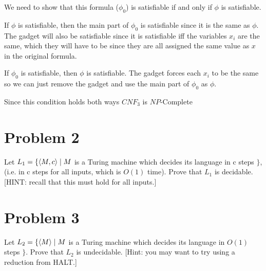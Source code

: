 \documentclass[12pt]{article}
\begin{document}
We need to show that this formula ($\phi_0$) is satisfiable if and only if $\phi$ is satisfiable.

If $\phi$ is satisfiable, then the main part of $\phi_0$ is satisfiable since it is the same as $\phi$. The gadget will also be satisfiable since it is satisfiable iff the variables $x_i$ are the same, which they will have to be since they are all assigned the same value as $x$ in the original formula.

If $\phi_0$ is satisfiable, then $\phi$ is satisfiable. The gadget forces each $x_i$ to be the same so we can just remove the gadget and use the main part of $\phi_0$ as $\phi$.

Since this condition holds both ways $CNF_3$ is $NP$-Complete


\section*{Problem 2}

\begin{questionbox}
	Let $L_1 = \{ \braket{M,c} \mid M$ is a Turing machine which decides its language in c steps $\}$, (i.e. in c
	steps for all inputs, which is $O(1)$ time). Prove that $L_1$ is decidable. [HINT: recall that this
	must hold for all inputs.]
\end{questionbox}

\section*{Problem 3}

\begin{questionbox}
	Let $L_2 = \{ \braket{M} \mid M $ is a Turing machine which decides its language in $O(1)$ steps $\}$. Prove that
	$L_2$ is undecidable. [Hint: you may want to try using a reduction from HALT.]
\end{questionbox}
\end{document}
